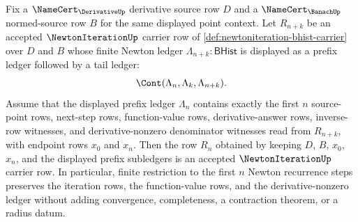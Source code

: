 \begin{theorem}
\label{thm:newtoniteration-finite-prefix-restriction-carrier}
Fix a $\NameCert_{\DerivativeUp}$ derivative source row $D$ and a $\NameCert_{\BanachUp}$ normed-source row $B$ for the same displayed point context. Let $R_{n+k}$ be an accepted $\NewtonIterationUp$ carrier row of \autoref{def:newtoniteration-bhist-carrier} over $D$ and $B$ whose finite Newton ledger $\Lambda_{n+k}:\mathsf{BHist}$ is displayed as a prefix ledger followed by a tail ledger:
$$
\Cont(\Lambda_n,\Lambda_k,\Lambda_{n+k}).
$$
Assume that the displayed prefix ledger $\Lambda_n$ contains exactly the first $n$ source-point rows, next-step rows, function-value rows, derivative-answer rows, inverse-row witnesses, and derivative-nonzero denominator witnesses read from $R_{n+k}$, with endpoint rows $x_0$ and $x_n$. Then the row $R_n$ obtained by keeping $D$, $B$, $x_0$, $x_n$, and the displayed prefix subledgers is an accepted $\NewtonIterationUp$ carrier row. In particular, finite restriction to the first $n$ Newton recurrence steps preserves the iteration rows, the function-value rows, and the derivative-nonzero ledger without adding convergence, completeness, a contraction theorem, or a radius datum.
\end{theorem}
